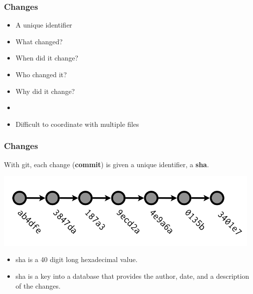   \begin{frame}[t]
    \frametitle{Changes}
    \begin{itemize}
      \item A unique identifier
      \item What changed?
      \item When did it change?
      \item Who changed it?
      \item Why did it change?
      \item[]
      \item Difficult to coordinate with multiple files
    \end{itemize}
  \end{frame}

  \begin{frame}[t]
    \frametitle{Changes}
    With git, each change ({\bf commit}) is given a unique identifier, a {\bf
    sha}.
    \begin{center}
      \includegraphics[width=0.98\textwidth]{../images/from-wickham-02.png} 
    \end{center} 

    \begin{itemize} 
      \item sha is a 40 digit long hexadecimal value.
      \item sha is a key into a database that provides the author, date, and a
        description of the changes.
    \end{itemize} 
  \end{frame}

